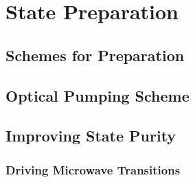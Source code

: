 \section{State Preparation}\label{sec:state_prep}
\subsection{Schemes for Preparation}
\subsection{Optical Pumping Scheme}
\subsection{Improving State Purity}
\subsubsection{Driving Microwave Transitions}